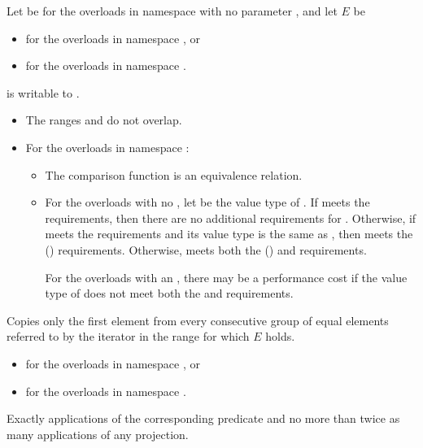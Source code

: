 \begin{itemdescr}
\pnum
Let  be  for the overloads
in namespace  with no parameter , and
let $E$ be
\begin{itemize}
\setlength{\emergencystretch}{1em}
\item
  for the overloads in namespace , or
\item
  for the overloads in namespace .
\end{itemize}

\pnum
\mandates
{} is writable to .

\pnum
\expects
\begin{itemize}
\item
  The ranges  and 
  do not overlap.
\item
  For the overloads in namespace :
  \begin{itemize}
  \item
    The comparison function is an equivalence relation.
  \item
    For the overloads with no ,
    let  be the value type of .
    If  meets
    the  requirements,
    then there are no additional requirements for .
    Otherwise, if  meets
    the  requirements and
    its value type is the same as ,
    then  meets
    the  () requirements.
    Otherwise,  meets both
    the  () and
     requirements.
    \begin{note}
    For the overloads with an ,
    there may be a performance cost
    if the value type of  does not meet both the
     and  requirements.
    \end{note}
  \end{itemize}
\end{itemize}

\pnum
\effects
Copies only the first element from every consecutive group of equal elements
referred to by the iterator  in the range 
for which $E$ holds.

\pnum
\returns
\begin{itemize}
\item {} for the overloads in namespace , or
\item {} for the overloads in namespace .
\end{itemize}

\pnum
\complexity
Exactly  applications
of the corresponding predicate
and no more than twice as many applications of any projection.
\end{itemdescr}


